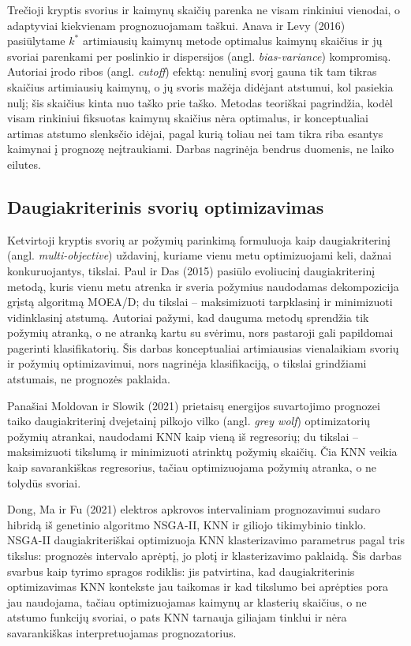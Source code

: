 \documentclass[]{VUMIFTemplateClass}
\begin{document}
    Trečioji kryptis svorius ir kaimynų skaičių parenka ne visam rinkiniui vienodai, o adaptyviai kiekvienam prognozuojamam taškui. Anava ir Levy (2016) pasiūlytame $k^*$ artimiausių kaimynų metode optimalus kaimynų skaičius ir jų svoriai parenkami per poslinkio ir dispersijos (angl. \textit{bias-variance}) kompromisą. Autoriai įrodo ribos (angl. \textit{cutoff}) efektą: nenulinį svorį gauna tik tam tikras skaičius artimiausių kaimynų, o jų svoris mažėja didėjant atstumui, kol pasiekia nulį; šis skaičius kinta nuo taško prie taško. Metodas teoriškai pagrindžia, kodėl visam rinkiniui fiksuotas kaimynų skaičius nėra optimalus, ir konceptualiai artimas atstumo slenksčio idėjai, pagal kurią toliau nei tam tikra riba esantys kaimynai į prognozę neįtraukiami. Darbas nagrinėja bendrus duomenis, ne laiko eilutes.

    \subsection{Daugiakriterinis svorių optimizavimas}

    Ketvirtoji kryptis svorių ar požymių parinkimą formuluoja kaip daugiakriterinį (angl. \textit{multi-objective}) uždavinį, kuriame vienu metu optimizuojami keli, dažnai konkuruojantys, tikslai. Paul ir Das (2015) pasiūlo evoliucinį daugiakriterinį metodą, kuris vienu metu atrenka ir sveria požymius naudodamas dekompozicija grįstą algoritmą MOEA/D; du tikslai -- maksimizuoti tarpklasinį ir minimizuoti vidinklasinį atstumą. Autoriai pažymi, kad dauguma metodų sprendžia tik požymių atranką, o ne atranką kartu su svėrimu, nors pastaroji gali papildomai pagerinti klasifikatorių. Šis darbas konceptualiai artimiausias vienalaikiam svorių ir požymių optimizavimui, nors nagrinėja klasifikaciją, o tikslai grindžiami atstumais, ne prognozės paklaida.

    Panašiai Moldovan ir Slowik (2021) prietaisų energijos suvartojimo prognozei taiko daugiakriterinį dvejetainį pilkojo vilko (angl. \textit{grey wolf}) optimizatorių požymių atrankai, naudodami KNN kaip vieną iš regresorių; du tikslai -- maksimizuoti tikslumą ir minimizuoti atrinktų požymių skaičių. Čia KNN veikia kaip savarankiškas regresorius, tačiau optimizuojama požymių atranka, o ne tolydūs svoriai.

    Dong, Ma ir Fu (2021) elektros apkrovos intervaliniam prognozavimui sudaro hibridą iš genetinio algoritmo NSGA-II, KNN ir giliojo tikimybinio tinklo. NSGA-II daugiakriteriškai optimizuoja KNN klasterizavimo parametrus pagal tris tikslus: prognozės intervalo aprėptį, jo plotį ir klasterizavimo paklaidą. Šis darbas svarbus kaip tyrimo spragos rodiklis: jis patvirtina, kad daugiakriterinis optimizavimas KNN kontekste jau taikomas ir kad tikslumo bei aprėpties pora jau naudojama, tačiau optimizuojamas kaimynų ar klasterių skaičius, o ne atstumo funkcijų svoriai, o pats KNN tarnauja giliajam tinklui ir nėra savarankiškas interpretuojamas prognozatorius. %
\end{document}
